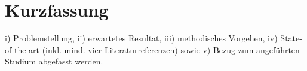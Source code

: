\chapter*{Kurzfassung}

i) Problemstellung, 
ii) erwartetes Resultat, 
iii) methodisches Vorgehen, 
iv) State-of-the art (inkl. mind. vier Literaturreferenzen) sowie 
v) Bezug zum angeführten Studium 
abgefasst werden.
